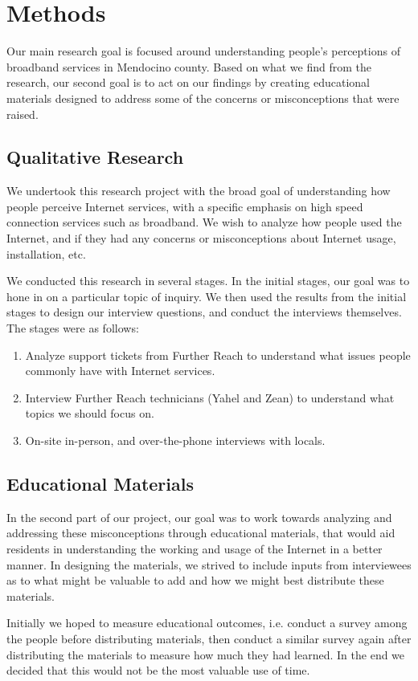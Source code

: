 \section{Methods}
\label{sec:methods}

Our main research goal is focused around understanding people's perceptions of
broadband services in Mendocino county. Based on what we find from the research,
our second goal is to act on our findings by creating educational materials
designed to address some of the concerns or misconceptions that were raised.

\subsection{Qualitative Research}
\label{subsec:qualitative_research}

We undertook this research project with the broad goal of understanding how
people perceive Internet services, with a specific emphasis on high speed
connection services such as broadband. We wish to analyze how people used
the Internet, and if they had any concerns or misconceptions about Internet
usage, installation, etc.

We conducted this research in several stages. In the initial stages, our goal
was to hone in on a particular topic of inquiry. We then used the results from the
initial stages to design our interview questions, and conduct the interviews
themselves. The stages were as follows:

\begin{enumerate}
\item Analyze support tickets from Further Reach to understand what issues
people commonly have with Internet services.
\item Interview Further Reach technicians (Yahel and Zean) to understand what
topics we should focus on.
\item On-site in-person, and over-the-phone interviews with locals.
\end{enumerate}

\subsection{Educational Materials}

In the second part of our project, our goal was to work towards analyzing
and addressing these misconceptions through educational materials, that would
aid residents in understanding the working and usage of the Internet in a
better manner. In designing the materials, we strived to include inputs from
interviewees as to what might be valuable to add and how we might best
distribute these materials.

Initially we hoped to measure educational outcomes, i.e. conduct a survey among the people before
distributing materials, then  conduct a similar survey again after distributing the materials
to measure how much they had learned. In the end we decided that this would
not be the most valuable use of time.

